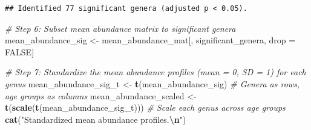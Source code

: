 \documentclass[
]{article}
\newenvironment{Shaded}{\begin{snugshade}}{\end{snugshade}}
\newcommand{\AttributeTok}[1]{\textcolor[rgb]{0.13,0.29,0.53}{#1}}
\newcommand{\CommentTok}[1]{\textcolor[rgb]{0.56,0.35,0.01}{\textit{#1}}}
\newcommand{\ConstantTok}[1]{\textcolor[rgb]{0.56,0.35,0.01}{#1}}
\newcommand{\ControlFlowTok}[1]{\textcolor[rgb]{0.13,0.29,0.53}{\textbf{#1}}}
\newcommand{\DecValTok}[1]{\textcolor[rgb]{0.00,0.00,0.81}{#1}}
\newcommand{\FloatTok}[1]{\textcolor[rgb]{0.00,0.00,0.81}{#1}}
\newcommand{\FunctionTok}[1]{\textcolor[rgb]{0.13,0.29,0.53}{\textbf{#1}}}
\newcommand{\NormalTok}[1]{#1}
\newcommand{\OtherTok}[1]{\textcolor[rgb]{0.56,0.35,0.01}{#1}}
\newcommand{\SpecialCharTok}[1]{\textcolor[rgb]{0.81,0.36,0.00}{\textbf{#1}}}
\newcommand{\StringTok}[1]{\textcolor[rgb]{0.31,0.60,0.02}{#1}}
\begin{document}
\begin{Shaded}
\end{Shaded}

\begin{verbatim}
## Identified 77 significant genera (adjusted p < 0.05).
\end{verbatim}

\begin{Shaded}
\begin{Highlighting}[]
\CommentTok{\# Step 6: Subset mean abundance matrix to significant genera}
\NormalTok{mean\_abundance\_sig }\OtherTok{\textless{}{-}}\NormalTok{ mean\_abundance\_mat[, significant\_genera, drop }\OtherTok{=} \ConstantTok{FALSE}\NormalTok{]}

\CommentTok{\# Step 7: Standardize the mean abundance profiles (mean = 0, SD = 1) for each genus}
\NormalTok{mean\_abundance\_sig\_t }\OtherTok{\textless{}{-}} \FunctionTok{t}\NormalTok{(mean\_abundance\_sig)  }\CommentTok{\# Genera as rows, age groups as columns}
\NormalTok{mean\_abundance\_scaled }\OtherTok{\textless{}{-}} \FunctionTok{t}\NormalTok{(}\FunctionTok{scale}\NormalTok{(}\FunctionTok{t}\NormalTok{(mean\_abundance\_sig\_t)))  }\CommentTok{\# Scale each genus across age groups}
\FunctionTok{cat}\NormalTok{(}\StringTok{"Standardized mean abundance profiles.}\SpecialCharTok{\textbackslash{}n}\StringTok{"}\NormalTok{)}
\end{Highlighting}
\end{Shaded}
\end{document}

